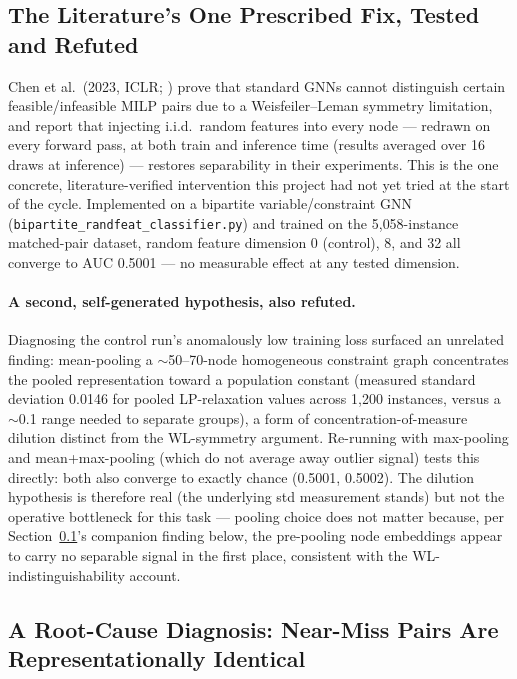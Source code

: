 \documentclass[12pt]{article}
\begin{document}
\subsection{The Literature's One Prescribed Fix, Tested and Refuted}
\label{sec:randfeat}

Chen et al.\ (2023, ICLR; \citealp{chen2023milp}) prove that standard GNNs cannot distinguish certain feasible/infeasible MILP pairs due to a Weisfeiler--Leman symmetry limitation, and report that injecting i.i.d.\ random features into every node --- redrawn on every forward pass, at both train and inference time (results averaged over 16 draws at inference) --- restores separability in their experiments. This is the one concrete, literature-verified intervention this project had not yet tried at the start of the cycle. Implemented on a bipartite variable/constraint GNN (\texttt{bipartite\_randfeat\_classifier.py}) and trained on the 5{,}058-instance matched-pair dataset, random feature dimension 0 (control), 8, and 32 all converge to AUC 0.5001 --- no measurable effect at any tested dimension.

\paragraph{A second, self-generated hypothesis, also refuted.} Diagnosing the control run's anomalously low training loss surfaced an unrelated finding: mean-pooling a $\sim$50--70-node homogeneous constraint graph concentrates the pooled representation toward a population constant (measured standard deviation 0.0146 for pooled LP-relaxation values across 1{,}200 instances, versus a $\sim$0.1 range needed to separate groups), a form of concentration-of-measure dilution distinct from the WL-symmetry argument. Re-running with max-pooling and mean+max-pooling (which do not average away outlier signal) tests this directly: both also converge to exactly chance (0.5001, 0.5002). The dilution hypothesis is therefore real (the underlying std measurement stands) but not the operative bottleneck for this task --- pooling choice does not matter because, per Section~\ref{sec:randfeat}'s companion finding below, the pre-pooling node embeddings appear to carry no separable signal in the first place, consistent with the WL-indistinguishability account.

\subsection{A Root-Cause Diagnosis: Near-Miss Pairs Are Representationally Identical}
\label{sec:gsprofile}
\end{document}
